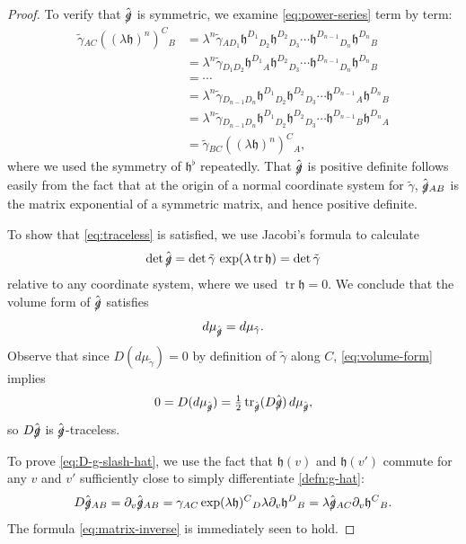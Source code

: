 \documentclass[10pt]{article}
\numberwithin{equation}{section}
\theoremstyle{plain}
\theoremstyle{definition}
\newcommand{\tr}{\operatorname{tr}}
\begin{document}
\begin{proof}
To verify that $\hat{\slashed g}$ is symmetric, we examine \eqref{eq:power-series} term by term:
\begin{align*}
 \tilde\gamma{}_{AC}   \left((\lambda\mathfrak h)^n\right)^C{}_B &=\lambda^n \tilde\gamma{}_{AD_1} \mathfrak h^{D_1}{}_{D_2} \mathfrak h^{D_2}{}_{D_3}\cdots \mathfrak h^{D_{n-1}}{}_{D_n} \mathfrak h^{D_n}{}_B\\
 &=\lambda^n \tilde\gamma{}_{D_1D_2} \mathfrak h^{D_1}{}_{A} \mathfrak h^{D_2}{}_{D_3}\cdots \mathfrak h^{D_{n-1}}{}_{D_n} \mathfrak h^{D_n}{}_B\\
 &=\cdots \\
 &= \lambda^n \tilde\gamma{}_{D_{n-1}D_n}\mathfrak h^{D_1}{}_{D_2}\mathfrak h^{D_2}{}_{D_3}\cdots \mathfrak h^{D_{n-1}}{}_A \mathfrak h^{D_n}{}_B\\
 &=\lambda^n \tilde\gamma{}_{D_{n-1}D_n}\mathfrak h^{D_1}{}_{D_2}\mathfrak h^{D_2}{}_{D_3}\cdots \mathfrak h^{D_{n-1}}{}_B \mathfrak h^{D_n}{}_A\\
 &= \tilde\gamma{}_{BC}   \left((\lambda\mathfrak h)^n\right)^C{}_A,
\end{align*}
where we used the symmetry of $\mathfrak h^\flat$ repeatedly. 
That $\hat{\slashed g}$ is positive definite follows easily from the fact that at the origin of a normal coordinate system for $\tilde\gamma$, $\hat{\slashed g}{}_{AB}$ is the matrix exponential of a symmetric matrix, and hence positive definite. 

To show that \eqref{eq:traceless} is satisfied, we use Jacobi's formula to calculate 
\begin{equation*}
    \det \hat{\slashed g} = \det \tilde\gamma\, \exp(\lambda \tr\mathfrak h) = \det\tilde\gamma
\end{equation*}
relative to any coordinate system, where we used $\tr\mathfrak h =0$. We conclude that the volume form of $\hat{\slashed g}$ satisfies 
\begin{equation}
  d\mu_{\hat{\slashed g}} = d\mu_{\tilde\gamma}.  \label{eq:volume-form}
\end{equation}
Observe that since $D(d\mu_{\tilde\gamma})=0$ by definition of $\tilde{\gamma}$ along $C$, \eqref{eq:volume-form} implies
\[0=D(d\mu_{\hat{\slashed g}})= \tfrac 12 \tr_{\hat{\slashed g}}(D\hat{\slashed g})\,d\mu_{\hat{\slashed g}},\] so $D\hat{\slashed g}$ is $\hat{\slashed g}$-traceless.

To prove \eqref{eq:D-g-slash-hat}, we use the fact that $\mathfrak h(v)$ and $\mathfrak h(v')$ commute for any $v$ and $v'$ sufficiently close to simply differentiate \eqref{defn:g-hat}:
\begin{equation*}
    D\hat{\slashed g}{}_{AB}= \partial_v \hat{\slashed g}{}_{AB} = \gamma_{AC}\exp(\lambda \mathfrak h)^C{}_D \lambda \partial_v \mathfrak h^D{}_B = \lambda \hat{\slashed g}{}_{AC} \partial_v \mathfrak h^C{}_B.  
\end{equation*}
The formula \eqref{eq:matrix-inverse} is immediately seen to hold. 
\end{proof}
\end{document}
